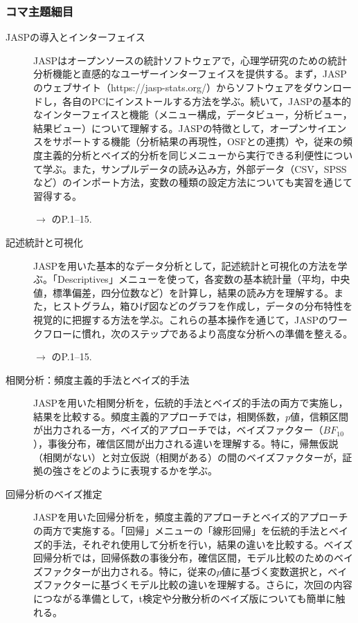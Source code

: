 \subsubsection{コマ主題細目}
\begin{description}
	\item[JASPの導入とインターフェイス] JASPはオープンソースの統計ソフトウェアで，心理学研究のための統計分析機能と直感的なユーザーインターフェイスを提供する。まず，JASPのウェブサイト（https://jasp-stats.org/）からソフトウェアをダウンロードし，各自のPCにインストールする方法を学ぶ。続いて，JASPの基本的なインターフェイスと機能（メニュー構成，データビュー，分析ビュー，結果ビュー）について理解する。JASPの特徴として，オープンサイエンスをサポートする機能（分析結果の再現性，OSFとの連携）や，従来の頻度主義的分析とベイズ的分析を同じメニューから実行できる利便性について学ぶ。また，サンプルデータの読み込み方，外部データ（CSV，SPSSなど）のインポート方法，変数の種類の設定方法についても実習を通じて習得する。
	      \begin{flushright}
		      $\to$ \textcite{YUnaShimizu2022}のP.1--15.
	      \end{flushright}

	\item[記述統計と可視化] JASPを用いた基本的なデータ分析として，記述統計と可視化の方法を学ぶ。「Descriptives」メニューを使って，各変数の基本統計量（平均，中央値，標準偏差，四分位数など）を計算し，結果の読み方を理解する。また，ヒストグラム，箱ひげ図などのグラフを作成し，データの分布特性を視覚的に把握する方法を学ぶ。これらの基本操作を通じて，JASPのワークフローに慣れ，次のステップであるより高度な分析への準備を整える。
		\begin{flushright}
		      $\to$ \textcite{YUnaShimizu2022}のP.1--15.
	      \end{flushright}

	\item[相関分析：頻度主義的手法とベイズ的手法] JASPを用いた相関分析を，伝統的手法とベイズ的手法の両方で実施し，結果を比較する。頻度主義的アプローチでは，相関係数，$p$値，信頼区間が出力される一方，ベイズ的アプローチでは，ベイズファクター（$BF_{10}$），事後分布，確信区間が出力される違いを理解する。特に，帰無仮説（相関がない）と対立仮説（相関がある）の間のベイズファクターが，証拠の強さをどのように表現するかを学ぶ。

	\item[回帰分析のベイズ推定] JASPを用いた回帰分析を，頻度主義的アプローチとベイズ的アプローチの両方で実施する。「回帰」メニューの「線形回帰」を伝統的手法とベイズ的手法，それぞれ使用して分析を行い，結果の違いを比較する。ベイズ回帰分析では，回帰係数の事後分布，確信区間，モデル比較のためのベイズファクターが出力される。特に，従来の$p$値に基づく変数選択と，ベイズファクターに基づくモデル比較の違いを理解する。さらに，次回の内容につながる準備として，t検定や分散分析のベイズ版についても簡単に触れる。

\end{description}
